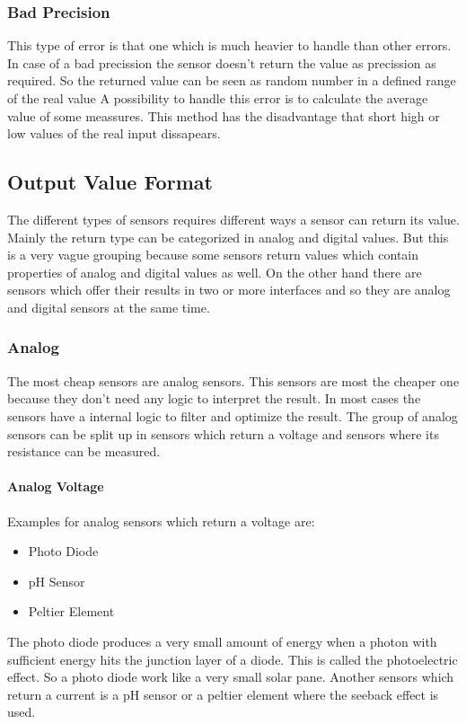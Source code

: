 \subsubsection{Bad Precision}
This type of error is that one which is much heavier to handle than other errors.
In case of a bad precission the sensor doesn't return the value as precission as required.
So the returned value can be seen as random number in a defined range of the real value
A possibility to handle this error is to calculate the average value of some meassures.
This method has the disadvantage that short high or low values of the real input dissapears.


\subsection{Output Value Format}
The different types of sensors requires different ways a sensor can return its value.
Mainly the return type can be categorized in analog and digital values.
But this is a very vague grouping because some sensors return values which contain properties of analog and digital values as well.
On the other hand there are sensors which offer their results in two or more interfaces and so they are analog and digital sensors at the same time.


\subsubsection{Analog}
The most cheap sensors are analog sensors.
This sensors are most the cheaper one because they don't need any logic to interpret the result.
In most cases the sensors have a internal logic to filter and optimize the result.
The group of analog sensors can be split up in sensors which return a voltage and sensors where its resistance can be measured.

\paragraph{Analog Voltage}
Examples for analog sensors which return a voltage are:
\begin{itemize}
\item Photo Diode
\item pH Sensor
\item Peltier Element
\end{itemize}
The photo diode produces a very small amount of energy when a photon with sufficient energy hits the junction layer of a diode.
This is called the photoelectric effect.
So a photo diode work like a very small solar pane.
Another sensors which return a current is a pH sensor or a peltier element where the seeback effect is used.

